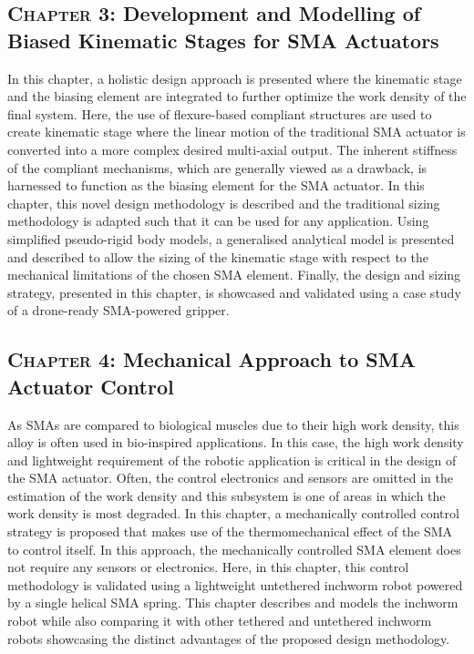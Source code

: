 \subsection*{\textsc{Chapter 3}: Development and Modelling of Biased Kinematic Stages for SMA Actuators}
In this chapter, a holistic design approach is presented where the kinematic stage and the biasing element are integrated to further optimize the work density of the final system. Here, the use of flexure-based compliant structures are used to create kinematic stage where the linear motion of the traditional SMA actuator is converted into a more complex desired multi-axial output. The inherent stiffness of the compliant mechanisms, which are generally viewed as a drawback, is harnessed to function as the biasing element for the SMA actuator. In this chapter, this novel design methodology is described and the traditional sizing methodology is adapted such that it can be used for any application. Using simplified pseudo-rigid body models, a generalised analytical model is presented and described to allow the sizing of the kinematic stage with respect to the mechanical limitations of the chosen SMA element. Finally, the design and sizing strategy, presented in this chapter, is showcased and validated using a case study of a drone-ready SMA-powered gripper.

\subsection*{\textsc{Chapter 4}: Mechanical Approach to SMA Actuator Control}
As SMAs are compared to biological muscles due to their high work density, this alloy is often used in bio-inspired applications. In this case, the high work density and lightweight requirement of the robotic application is critical in the design of the SMA actuator. Often, the control electronics and sensors are omitted in the estimation of the work density and this subsystem is one of areas in which the work density is most degraded. In this chapter, a mechanically controlled control strategy is proposed that makes use of the thermomechanical effect of the SMA to control itself. In this approach, the mechanically controlled SMA element does not require any sensors or electronics. Here, in this chapter, this control methodology is validated using a lightweight untethered inchworm robot powered by a single helical SMA spring. This chapter describes and models the inchworm robot while also comparing it with other tethered and untethered inchworm robots showcasing the distinct advantages of the proposed design methodology.

